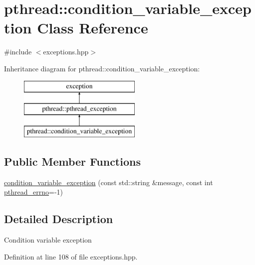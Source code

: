 \hypertarget{classpthread_1_1condition__variable__exception}{\section{pthread\+:\+:condition\+\_\+variable\+\_\+exception Class Reference}
\label{classpthread_1_1condition__variable__exception}
}


{\ttfamily \#include $<$exceptions.\+hpp$>$}

Inheritance diagram for pthread\+:\+:condition\+\_\+variable\+\_\+exception\+:\begin{figure}[H]
\begin{center}
\leavevmode
\includegraphics[height=3.000000cm]{classpthread_1_1condition__variable__exception}
\end{center}
\end{figure}
\subsection*{Public Member Functions}
\begin{DoxyCompactItemize}
\item 
\hyperlink{classpthread_1_1condition__variable__exception_a5405694c69de500c7c6fdaba3e3af8a5}{condition\+\_\+variable\+\_\+exception} (const std\+::string \&message, const int \hyperlink{classpthread_1_1pthread__exception_a4a869173054faca1945ac1a7729082d6}{pthread\+\_\+errno}=-\/1)
\end{DoxyCompactItemize}


\subsection{Detailed Description}
Condition variable exception 

Definition at line 108 of file exceptions.\+hpp.



